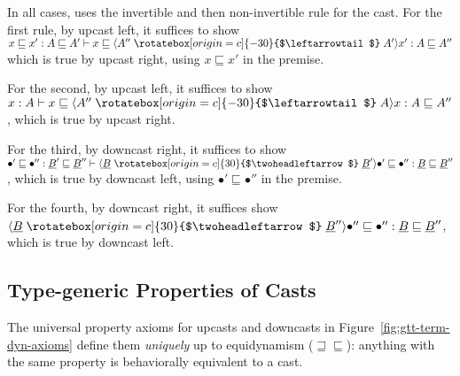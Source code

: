 \documentclass[acmsmall,screen,12pt]{acmart}
\renewcommand{\u}{\underline}
\newcommand{\ltdyn}{\sqsubseteq}
\newcommand{\gtdyn}{\sqsupseteq}
\newcommand{\equidyn}{\mathrel{\gtdyn\ltdyn}}
\newcommand{\uarrow}{\mathrel{\rotatebox[origin=c]{-30}{$\leftarrowtail$}}}
\newcommand{\darrow}{\mathrel{\rotatebox[origin=c]{30}{$\twoheadleftarrow$}}}
\newcommand{\upcast}[2]{\langle{#2}\uarrow{#1}\rangle}
\newcommand{\dncast}[2]{\langle{#1}\darrow{#2}\rangle}
\begin{document}
\begin{longonly}
\begin{lemma}
\begin{small}
\end{small}
\end{lemma}
\begin{longproof}
In all cases, uses the invertible and then non-invertible rule for the
cast.  For the first rule, by upcast left, it suffices to show $x \ltdyn
x' : A \ltdyn A' \vdash {x} \ltdyn \upcast{A'}{A''}{x'} : A \ltdyn A''$
which is true by upcast right, using $x \ltdyn x'$ in the premise.

For the second, by upcast left, it suffices to show 
$x : A \vdash {x} \ltdyn \upcast{A}{A''}{x} : A \ltdyn A''$,
which is true by upcast right.

For the third, by downcast right, it suffices to show 
$\bullet' \ltdyn \bullet'' : \u B' \ltdyn \u B'' \vdash \dncast{\u B}{\u B'}{\bullet'} \ltdyn {\bullet''} : \u B \ltdyn \u B''$,
which is true by downcast left, using $\bullet' \ltdyn \bullet''$ in the premise.

For the fourth, by downcast right, it suffices show
$\dncast{\u B}{\u B''}{\bullet''}\ltdyn {\bullet''} : \u B \ltdyn \u B''$,
which is true by downcast left.
\end{longproof}
\end{longonly}

\subsection{Type-generic Properties of Casts}

The universal property axioms for upcasts and downcasts in
Figure~\ref{fig:gtt-term-dyn-axioms} define them \emph{uniquely} up to
equidynamism ($\equidyn$): anything with the same property 
is behaviorally equivalent to a cast.
\end{document}
